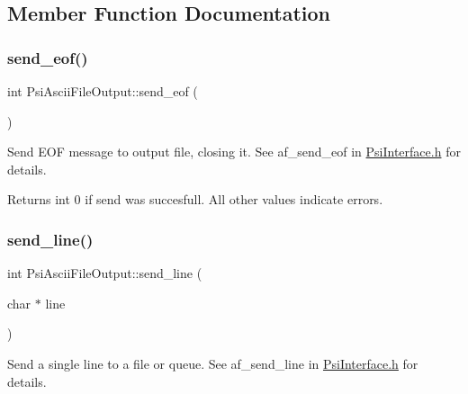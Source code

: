 \subsection{Member Function Documentation}
\mbox{\label{classPsiAsciiFileOutput_a9173658e711537902ea50bf8c3b5b292}} 
\subsubsection{\texorpdfstring{send\+\_\+eof()}{send\_eof()}}
{\footnotesize\ttfamily int Psi\+Ascii\+File\+Output\+::send\+\_\+eof (\begin{DoxyParamCaption}{ }\end{DoxyParamCaption})\hspace{0.3cm}{\ttfamily [inline]}}



Send E\+OF message to output file, closing it. See af\+\_\+send\+\_\+eof in \hyperlink{PsiInterface_8h_source}{Psi\+Interface.\+h} for details. 

\begin{DoxyReturn}{Returns}
int 0 if send was succesfull. All other values indicate errors. 
\end{DoxyReturn}
\mbox{\label{classPsiAsciiFileOutput_ad90b9b03bdf05f14be85fe0735df60a9}} 
\subsubsection{\texorpdfstring{send\+\_\+line()}{send\_line()}}
{\footnotesize\ttfamily int Psi\+Ascii\+File\+Output\+::send\+\_\+line (\begin{DoxyParamCaption}\item[{char $\ast$}]{line }\end{DoxyParamCaption})\hspace{0.3cm}{\ttfamily [inline]}}



Send a single line to a file or queue. See af\+\_\+send\+\_\+line in \hyperlink{PsiInterface_8h_source}{Psi\+Interface.\+h} for details. 


